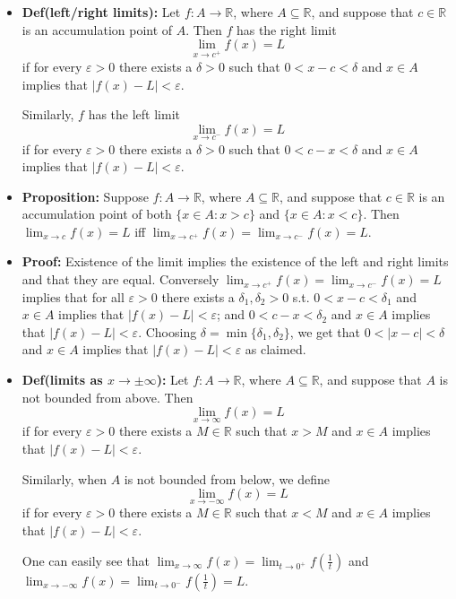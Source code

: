 \documentclass{article}
\begin{document}
\begin{itemize}
\item \textbf{Def(left/right limits):} Let $f: A \to \mathbb{R}$, where $A \subseteq \mathbb{R}$, and suppose that $c \in \mathbb{R}$ is an accumulation point of $A$. Then $f$ has the right limit
\[
\lim_{x \to c^+} f(x) = L
\]
if for every $\varepsilon > 0$ there exists a $\delta > 0$ such that $0 < x - c < \delta$ and $x \in A$ implies that $|f(x) - L| < \varepsilon$.

Similarly, $f$ has the left limit
\[
\lim_{x \to c^-} f(x) = L
\]
if for every $\varepsilon > 0$ there exists a $\delta > 0$ such that $0 < c - x < \delta$ and $x \in A$ implies that $|f(x) - L| < \varepsilon$.

\item \textbf{Proposition:} Suppose $f: A \to \mathbb{R}$, where $A \subseteq \mathbb{R}$, and suppose that $c \in \mathbb{R}$ is an accumulation point of both $\{x \in A:x > c\}$ and $\{x \in A:x < c\}$. Then $\displaystyle \lim_{x \to c} f(x) = L$ iff $\displaystyle \lim_{x \to c^+} f(x) = \lim_{x \to c^-} f(x) = L$.

\item \textbf{Proof:} Existence of the limit implies the existence of the left and right limits and that they are equal. Conversely $\displaystyle \lim_{x \to c^+} f(x) = \lim_{x \to c^-} f(x) = L$ implies that for all $\varepsilon > 0$ there exists a $\delta_1, \delta_2 > 0$ s.t. $0 < x - c < \delta_1$ and $x \in A$ implies that $|f(x) - L| < \varepsilon$; and $0 < c - x < \delta_2$ and $x \in A$ implies that $|f(x) - L| < \varepsilon$. Choosing $\delta = \min\{\delta_1, \delta_2\}$, we get that $0 < |x - c| < \delta$ and $x \in A$ implies that $|f(x) - L| < \varepsilon$ as claimed.

\item \textbf{Def(limits as $x \to \pm \infty$):} Let $f: A \to \mathbb{R}$, where $A \subseteq \mathbb{R}$, and suppose that $A$ is not bounded from above. Then
\[
\lim_{x \to \infty} f(x) = L
\]
if for every $\varepsilon > 0$ there exists a $M \in \mathbb{R}$ such that $x > M$ and $x \in A$ implies that $|f(x) - L| < \varepsilon$.

Similarly, when $A$ is not bounded from below, we define
\[
\lim_{x \to -\infty} f(x) = L
\]
if for every $\varepsilon > 0$ there exists a $M \in \mathbb{R}$ such that $x < M$ and $x \in A$ implies that $|f(x) - L| < \varepsilon$.

One can easily see that $\displaystyle \lim_{x \to \infty} f(x) = \lim_{t \to 0^+} f\left(\frac{1}{t}\right)$ and $\displaystyle \lim_{x \to -\infty} f(x) = \lim_{t \to 0^-} f\left(\frac{1}{t}\right) = L$.


\end{itemize}
\end{document}
